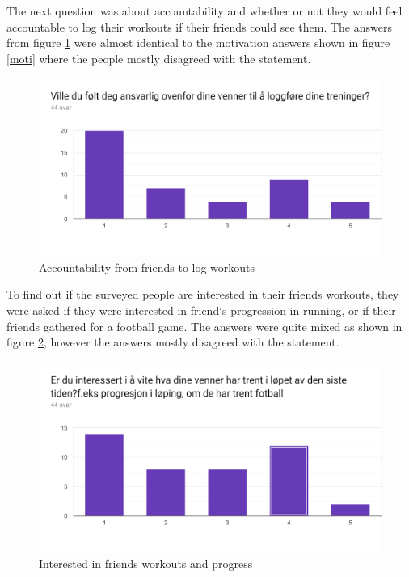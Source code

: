 The next question was about accountability and whether or not they would feel accountable to log their workouts if their friends could see them. The answers from figure \ref{acc} were almost identical to the motivation answers shown in figure \ref{moti} where the people mostly disagreed with the statement.

\begin{figure}[H]
    \centering
    \includegraphics[width=120mm]{figures/AnsvarligLogging.png}
    \caption{Accountability from friends to log workouts}
    \label{acc}
\end{figure}
To find out if the surveyed people are interested in their friends workouts, they were asked if they were interested in friend`s progression in running, or if their friends gathered for a football game. The answers were quite mixed as shown in figure \ref{inti}, however the answers mostly disagreed with the statement. 
\begin{figure}[H]
    \centering
    \includegraphics[width=120mm]{figures/AndresTrening.png}
    \caption{Interested in friends workouts and progress}
    \label{inti}
\end{figure}

